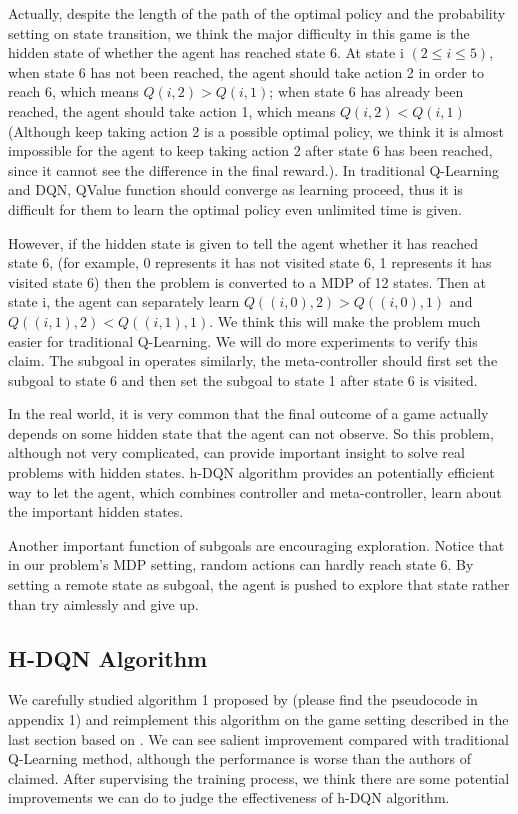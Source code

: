 \documentclass{article}
\begin{document}
\begin{spacing}{1.1}
    Actually, despite the length of the path of the optimal policy and the probability setting on state transition, we think the major difficulty in this game is the hidden state of whether the agent has reached state 6. At state i $(2\leq i\leq 5)$, when state 6 has not been reached, the agent should take action 2 in order to reach 6, which means $Q(i, 2) > Q(i, 1)$; when state 6 has already been reached, the agent should take action 1, which means $Q(i, 2) < Q(i, 1)$ (Although keep taking action 2 is a possible optimal policy, we think it is almost impossible for the agent to keep taking action 2 after state 6 has been reached, since it cannot see the difference in the final reward.). In traditional Q-Learning and DQN, QValue function should converge as learning proceed, thus it is difficult for them to learn the optimal policy even unlimited time is given.

    However, if the hidden state is given to tell the agent whether it has reached state 6, (for example, 0 represents it has not visited state 6, 1 represents it has visited state 6) then the problem is converted to a MDP of 12 states. Then at state i, the agent can separately learn $Q((i, 0), 2) > Q((i, 0), 1)$ and $Q((i, 1), 2) < Q((i, 1), 1)$. We think this will make the problem much easier for traditional Q-Learning. We will do more experiments to verify this claim. The subgoal in \cite{AI-16} operates similarly, the meta-controller should first set the subgoal to state 6 and then set the subgoal to state 1 after state 6 is visited.

    In the real world, it is very common that the final outcome of a game actually depends on some hidden state that the agent can not observe. So this problem, although not very complicated, can provide important insight to solve real problems with hidden states. h-DQN algorithm provides an potentially efficient way to let the agent, which combines controller and meta-controller, learn about the important hidden states.

    Another important function of subgoals are encouraging exploration. Notice that in our problem's MDP setting, random actions can hardly reach state 6. By setting a remote state as subgoal, the agent is pushed to explore that state rather than try aimlessly and give up.
    \subsection{H-DQN Algorithm}
    We carefully studied algorithm 1 proposed by \cite{AI-16} (please find the pseudocode in appendix 1) and reimplement this algorithm on the game setting described in the last section based on \cite{github}. We can see salient improvement compared with traditional Q-Learning method, although the performance is worse than the authors of \cite{AI-16} claimed. After supervising the training process, we think there are some potential improvements we can do to judge the effectiveness of h-DQN algorithm.


\end{spacing}
\end{document}
